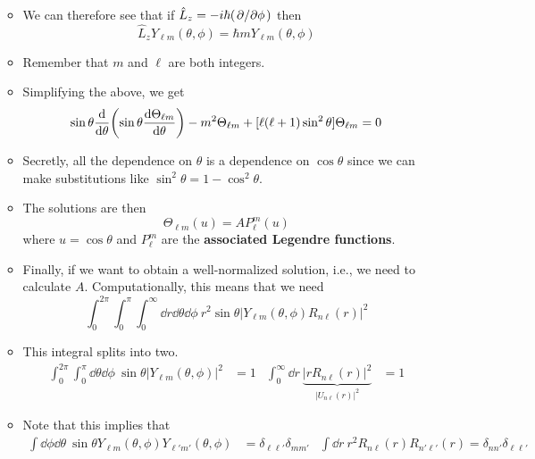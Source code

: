 \documentclass[../notes.tex]{subfiles}
\begin{document}
\begin{itemize}
\begin{itemize}
\begin{equation*}
        \end{equation*}
        \item We can therefore see that if $\hat{L}_z=-i\hbar(\pdv*{\phi})$ then
        \begin{equation*}
            \hat{L}_zY_{\ell m}(\theta,\phi) = \hbar mY_{\ell m}(\theta,\phi)
        \end{equation*}
        \item Remember that $m$ and $\ell$ are both integers.
        \item Simplifying the above, we get
        \begin{equation*}
            \sin\theta\dv{\theta}(\sin\theta\dv{\Theta_{\ell m}}{\theta})-m^2\Theta_{\ell m}+[\ell(\ell+1)\sin^2\theta]\Theta_{\ell m} = 0
        \end{equation*}
        \item Secretly, all the dependence on $\theta$ is a dependence on $\cos\theta$ since we can make substitutions like $\sin^2\theta=1-\cos^2\theta$.
        \item The solutions are then
        \begin{equation*}
            \Theta_{\ell m}(u) = AP_\ell^m(u)
        \end{equation*}
        where $u=\cos\theta$ and $P_\ell^m$ are the \textbf{associated Legendre functions}.
        \item Finally, if we want to obtain a well-normalized solution, i.e., we need to calculate $A$. Computationally, this means that we need
        \begin{equation*}
            \int_0^{2\pi}\int_0^\pi\int_0^\infty\dd{r}\dd\theta\dd\phi\ r^2\sin\theta|Y_{\ell m}(\theta,\phi)R_{n\ell}(r)|^2
        \end{equation*}
        \item This integral splits into two.
        \begin{align*}
            \int_0^{2\pi}\int_0^\pi\dd\theta\dd\phi\ \sin\theta|Y_{\ell m}(\theta,\phi)|^2 &= 1&
            \int_0^\infty\dd{r}\ \underbrace{|rR_{n\ell}(r)|^2}_{|U_{n\ell}(r)|^2} &= 1
        \end{align*}
        \item Note that this implies that
        \begin{align*}
            \int\dd\phi\dd\theta\ \sin\theta Y_{\ell m}(\theta,\phi)Y_{\ell'm'}(\theta,\phi) &= \delta_{\ell\ell'}\delta_{mm'}&
            \int\dd{r}\ r^2R_{n\ell}(r)R_{n'\ell'}(r) = \delta_{nn'}\delta_{\ell\ell'}
        \end{align*}

\end{itemize}
\end{itemize}
\end{document}
